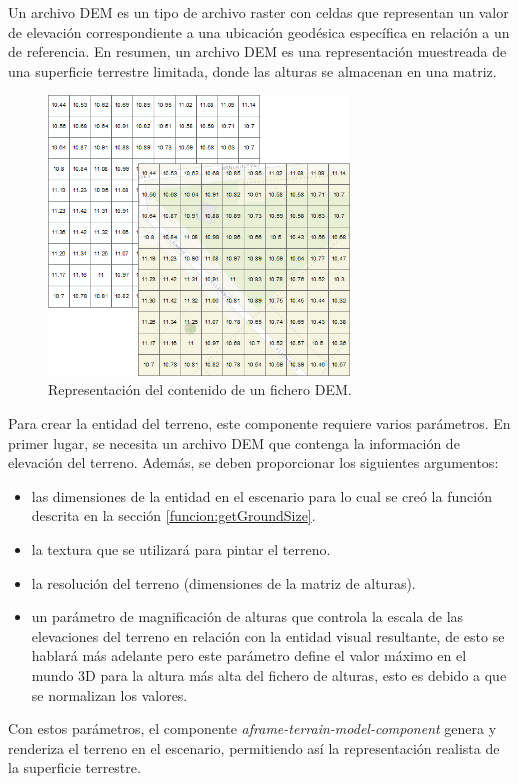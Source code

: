 \documentclass[a4paper, 11pt]{book}
\begin{document}
Un archivo DEM es un tipo de archivo raster con celdas que representan un valor de elevación correspondiente a una ubicación geodésica específica en relación a un  de referencia. En resumen, un archivo DEM es una representación muestreada de una superficie terrestre limitada, donde las alturas se almacenan en una matriz.

\begin{figure}[h]
  \centering
  \includegraphics[width=8cm, keepaspectratio]{img/dem.png}
  \caption{Representación del contenido de un fichero DEM.}
  \label{fig:dem}
\end{figure}

Para crear la entidad del terreno, este componente requiere varios parámetros. En primer lugar, se necesita un archivo DEM que contenga la información de elevación del terreno. Además, se deben proporcionar los siguientes argumentos:
\begin{itemize}
	\item las dimensiones de la entidad en el escenario para lo cual se creó la función descrita en la sección \ref{funcion:getGroundSize}.
	\item la textura que se utilizará para pintar el terreno.
	\item la resolución del terreno (dimensiones de la matriz de alturas).
	\item un parámetro de magnificación de alturas que controla la escala de las elevaciones del terreno en relación con la entidad visual resultante, de esto se hablará más adelante pero este parámetro define el valor máximo en el mundo 3D para la altura más alta del fichero de alturas, esto es debido a que se normalizan los valores.
\end{itemize}
Con estos parámetros, el componente \emph{aframe-terrain-model-component} genera y renderiza el terreno en el escenario, permitiendo así la representación realista de la superficie terrestre.
\end{document}
